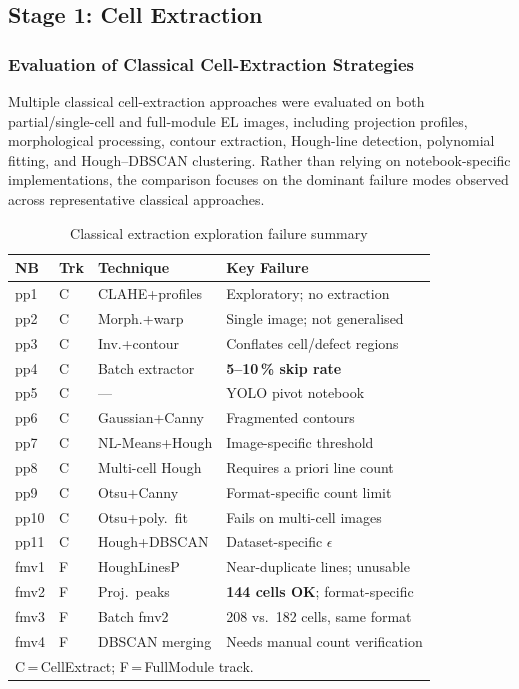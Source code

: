 \documentclass[conference]{IEEEtran}
\begin{document}
\subsection{Stage 1: Cell Extraction}
\label{sec:stage1}

\subsubsection{Evaluation of Classical Cell-Extraction Strategies}

Multiple classical cell-extraction approaches were evaluated on both partial/single-cell and full-module EL images, including projection profiles, morphological processing, contour extraction, Hough-line detection, polynomial fitting, and Hough–DBSCAN clustering. Rather than relying on notebook-specific implementations, the comparison focuses on the dominant failure modes observed across representative classical approaches.

\begin{table}[t]
  \caption{Classical extraction exploration failure summary}
  \label{tab:classical_all}
  \begin{center}
  \renewcommand{\arraystretch}{0.9}\scriptsize
  \begin{tabular}{p{0.55cm}p{0.35cm}p{1.65cm}p{3.55cm}}
    \toprule
    \textbf{NB} & \textbf{Trk} & \textbf{Technique} & \textbf{Key Failure}\\
    \midrule
    pp1  & C & CLAHE+profiles   & Exploratory; no extraction\\
    pp2  & C & Morph.+warp      & Single image; not generalised\\
    pp3  & C & Inv.+contour     & Conflates cell/defect regions\\
    pp4  & C & Batch extractor  & \textbf{5--10\,\% skip rate}\\
    pp5  & C & ---              & YOLO pivot notebook\\
    pp6  & C & Gaussian+Canny   & Fragmented contours\\
    pp7  & C & NL-Means+Hough   & Image-specific threshold\\
    pp8  & C & Multi-cell Hough & Requires a priori line count\\
    pp9  & C & Otsu+Canny       & Format-specific count limit\\
    pp10 & C & Otsu+poly.\ fit  & Fails on multi-cell images\\
    pp11 & C & Hough+DBSCAN     & Dataset-specific $\epsilon$\\
    \midrule
    fmv1 & F & HoughLinesP      & Near-duplicate lines; unusable\\
    fmv2 & F & Proj.\ peaks     & \textbf{144 cells OK}; format-specific\\
    fmv3 & F & Batch fmv2       & 208 vs.\ 182 cells, same format\\
    fmv4 & F & DBSCAN merging   & Needs manual count verification\\
    \bottomrule
    \multicolumn{4}{l}{\scriptsize C\,=\,CellExtract; F\,=\,FullModule track.}
  \end{tabular}
  \end{center}
\end{table}
\end{document}
